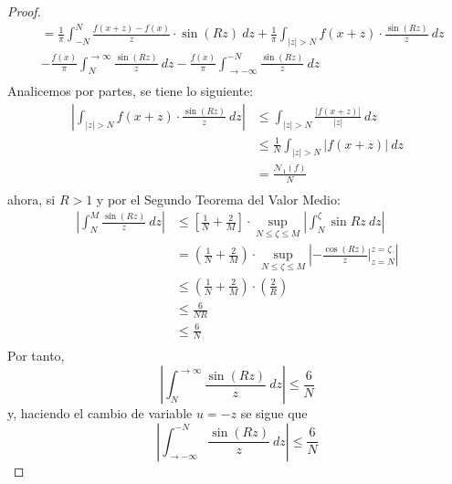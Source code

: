 \documentclass[12pt]{report}
\theoremstyle{largebreak}
\renewcommand{\leq}{\ensuremath{\leqslant}}
\newcommand\abs[1]{\ensuremath{\left|#1\right|}}
\newcommand{\N}[2]{\ensuremath{\mathcal{N}_{#1}\left(#2\right)}}
\begin{document}
\begin{proof}
\begin{equation*}
\begin{split}
                &=\frac{1}{\pi}\int_{-N}^{N}\frac{f(x+z)-f(x)}{z}\cdot\sin(Rz)\:dz+\frac{1}{\pi}\int_{\abs{z}>N}f(x+z)\cdot\frac{\sin(Rz)}{z}\:dz\\
                &-\frac{f(x)}{\pi}\int_{N}^{\rightarrow\infty}\frac{\sin (Rz)}{z}\:dz-\frac{f(x)}{\pi}\int_{\rightarrow-\infty}^{-N}\frac{\sin (Rz)}{z}\:dz\\
            \end{split}
        \end{equation*}
        Analicemos por partes, se tiene lo siguiente:
        \begin{equation*}
            \begin{split}
                \abs{\int_{\abs{z}>N}f(x+z)\cdot\frac{\sin(Rz)}{z}\:dz}&\leq\int_{\abs{z}>N}\frac{\abs{f(x+z)}}{\abs{z}}\:dz\\
                &\leq\frac{1}{N}\int_{\abs{z}>N}\abs{f(x+z)}\:dz\\
                &=\frac{\N{1}{f}}{N}\\
            \end{split}
        \end{equation*}
        ahora, si $R>1$ y por el Segundo Teorema del Valor Medio:
        \begin{equation*}
            \begin{split}
                \abs{\int_{N}^{M}\frac{\sin (Rz)}{z}\:dz}&\leq\left[\frac{1}{N}+\frac{2}{M} \right]\cdot\sup_{N\leq\zeta\leq M}\abs{\int_{N}^{\zeta}\sin Rz\:dz}\\
                &=\left(\frac{1}{N}+\frac{2}M{}\right)\cdot\sup_{N\leq\zeta\leq M}\abs{-\frac{\cos(Rz)}{z}\Big|_{z=N}^{ z=\zeta}}\\
                &\leq\left(\frac{1}{N}+\frac{2}{M}\right)\cdot\left(\frac{2}{R}\right)\\
                &\leq\frac{6}{NR}\\
                &\leq\frac{6}{N}\\
            \end{split}
        \end{equation*}
        Por tanto,
        \begin{equation*}
            \abs{\int_{N}^{\rightarrow\infty}\frac{\sin (Rz)}{z}\:dz}\leq\frac{6}{N}
        \end{equation*}
        y, haciendo el cambio de variable $u=-z$ se sigue que
        \begin{equation*}
            \abs{\int_{\rightarrow-\infty}^{-N}\frac{\sin (Rz)}{z}\:dz}\leq\frac{6}{N}

\end{equation*}
\end{proof}
\end{document}
